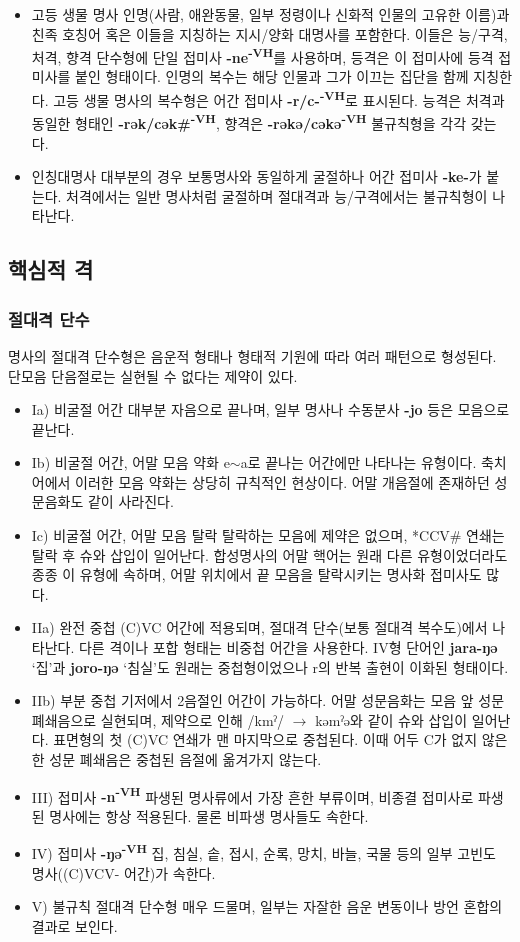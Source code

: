\begin{itemize}
	\item{고등 생물 명사} 인명(사람, 애완동물, 일부 정령이나 신화적 인물의 고유한 이름)과 친족 호칭어 혹은 이들을 지칭하는 지시/양화 대명사를 포함한다. 이들은 능/구격, 처격, 향격 단수형에 단일 접미사 \textbf{-ne\textsuperscript{-VH}}를 사용하며, 등격은 이 접미사에 등격 접미사를 붙인 형태이다. 인명의 복수는 해당 인물과 그가 이끄는 집단을 함께 지칭한다. 고등 생물 명사의 복수형은 어간 접미사 \textbf{-r/c-\textsuperscript{-VH}}로 표시된다. 능격은 처격과 동일한 형태인 \textbf{-rək/cək\#\textsuperscript{-VH}}, 향격은 \textbf{-rəkə/cəkə\textsuperscript{-VH}} 불규칙형을 각각 갖는다.
	\item{인칭대명사} 대부분의 경우 보통명사와 동일하게 굴절하나 어간 접미사 \textbf{-ke-}가 붙는다. 처격에서는 일반 명사처럼 굴절하며 절대격과 능/구격에서는 불규칙형이 나타난다.
\end{itemize}
\subsection{핵심적 격}
\subsubsection{절대격 단수}
명사의 절대격 단수형은 음운적 형태나 형태적 기원에 따라 여러 패턴으로 형성된다. 단모음 단음절로는 실현될 수 없다는 제약이 있다.
\begin{itemize}
	\item{Ia) 비굴절 어간} 대부분 자음으로 끝나며, 일부 명사나 수동분사 \textbf{-jo} 등은 모음으로 끝난다.
	\item{Ib) 비굴절 어간, 어말 모음 약화} e$\sim$a로 끝나는 어간에만 나타나는 유형이다. 축치어에서 이러한 모음 약화는 상당히 규칙적인 현상이다. 어말 개음절에 존재하던 성문음화도 같이 사라진다.
	\item{Ic) 비굴절 어간, 어말 모음 탈락} 탈락하는 모음에 제약은 없으며, *CCV\# 연쇄는 탈락 후 슈와 삽입이 일어난다. 합성명사의 어말 핵어는 원래 다른 유형이었더라도 종종 이 유형에 속하며, 어말 위치에서 끝 모음을 탈락시키는 명사화 접미사도 많다.
	\item{IIa) 완전 중첩} (C)VC 어간에 적용되며, 절대격 단수(보통 절대격 복수도)에서 나타난다. 다른 격이나 포합 형태는 비중첩 어간을 사용한다. IV형 단어인 \textbf{jara-ŋə} `집'과 \textbf{joro-ŋə} `침실'도 원래는 중첩형이었으나 r의 반복 출현이 이화된 형태이다.
	\item{IIb) 부분 중첩} 기저에서 2음절인 어간이 가능하다. 어말 성문음화는 모음 앞 성문 폐쇄음으로 실현되며, 제약으로 인해 /kmˀ/ $\rightarrow$ kəmˀə와 같이 슈와 삽입이 일어난다. 표면형의 첫 (C)VC 연쇄가 맨 마지막으로 중첩된다. 이때 어두 C가 없지 않은 한 성문 폐쇄음은 중첩된 음절에 옮겨가지 않는다.
	\item{III) 접미사 \textbf{-n\textsuperscript{-VH}}} 파생된 명사류에서 가장 흔한 부류이며, 비종결 접미사로 파생된 명사에는 항상 적용된다. 물론 비파생 명사들도 속한다.
	\item{IV) 접미사 \textbf{-ŋə\textsuperscript{-VH}}} 집, 침실, 솥, 접시, 순록, 망치, 바늘, 국물 등의 일부 고빈도 명사((C)VCV- 어간)가 속한다.
	\item{V) 불규칙 절대격 단수형} 매우 드물며, 일부는 자잘한 음운 변동이나 방언 혼합의 결과로 보인다.
\end{itemize}
